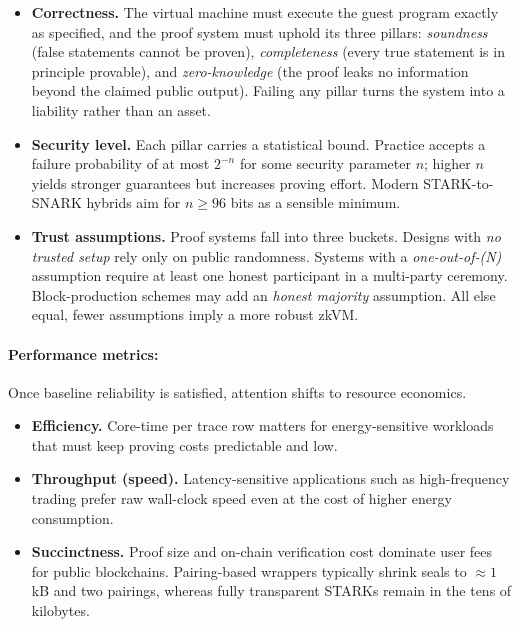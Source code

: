 \begin{itemize}
  \item \textbf{Correctness.}  
        The virtual machine must execute the guest program exactly as specified, and the proof system must uphold its three pillars:  
        \textit{soundness} (false statements cannot be proven),  
        \textit{completeness} (every true statement is in principle provable),  
        and \textit{zero-knowledge} (the proof leaks no information beyond the claimed public output).  
        Failing any pillar turns the system into a liability rather than an asset.
  \item \textbf{Security level.}  
        Each pillar carries a statistical bound.  
        Practice accepts a failure probability of at most \(2^{-n}\) for some security parameter \(n\); higher \(n\) yields stronger guarantees but increases proving effort.  
        Modern STARK-to-SNARK hybrids aim for \(n\ge 96\) bits as a sensible minimum.
  \item \textbf{Trust assumptions.}  
        Proof systems fall into three buckets.  
        Designs with \textit{no trusted setup} rely only on public randomness.  
        Systems with a \textit{one-out-of-(N)} assumption require at least one honest participant in a multi-party ceremony.  
        Block-production schemes may add an \textit{honest majority} assumption.  
        All else equal, fewer assumptions imply a more robust zkVM.
\end{itemize}

\paragraph{Performance metrics:}
Once baseline reliability is satisfied, attention shifts to resource economics.

\begin{itemize}
  \item \textbf{Efficiency.}  
        Core-time per trace row matters for energy-sensitive workloads that must keep proving costs predictable and low.
  \item \textbf{Throughput (speed).}  
        Latency-sensitive applications such as high-frequency trading prefer raw wall-clock speed even at the cost of higher energy consumption.
  \item \textbf{Succinctness.}  
        Proof size and on-chain verification cost dominate user fees for public blockchains.  
        Pairing-based wrappers typically shrink seals to \(\approx1\)\,kB and two pairings, whereas fully transparent STARKs remain in the tens of kilobytes.
\end{itemize}

